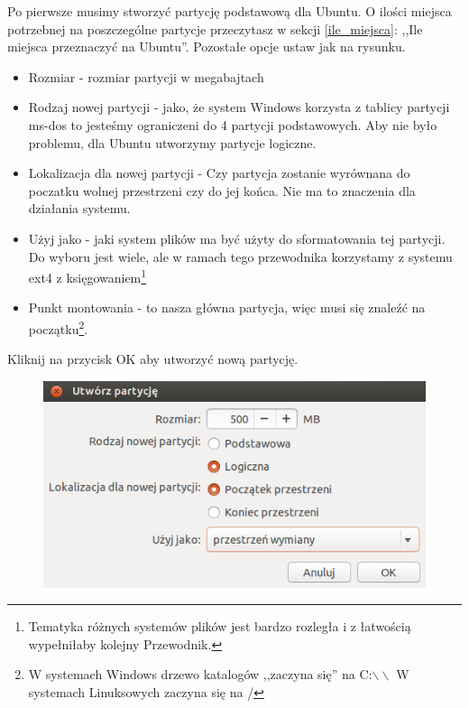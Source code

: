 Po pierwsze musimy stworzyć partycję podstawową dla Ubuntu. O ilości miejsca potrzebnej na poszczególne partycje przeczytasz w sekcji \ref{ile_miejsca}: ,,Ile miejsca przeznaczyć na Ubuntu''. Pozostałe opcje ustaw jak na rysunku.
\begin{itemize}
\item \textcolor{ubuntu_orange}{Rozmiar} - rozmiar partycji w megabajtach
\item \textcolor{ubuntu_orange}{Rodzaj nowej partycji} - jako, że system Windows korzysta z tablicy partycji ms-dos to jesteśmy ograniczeni do 4 partycji podstawowych. Aby nie było problemu, dla Ubuntu utworzymy partycje logiczne.
\item \textcolor{ubuntu_orange}{Lokalizacja dla nowej partycji} - Czy partycja zostanie wyrównana do poczatku wolnej przestrzeni czy do jej końca. Nie ma to znaczenia dla działania systemu.
\item \textcolor{ubuntu_orange}{Użyj jako} - jaki system plików ma być użyty do sformatowania tej partycji. Do wyboru jest wiele, ale w ramach tego przewodnika korzystamy z systemu ext4 z księgowaniem\footnote{Tematyka różnych systemów plików jest bardzo rozległa i z łatwością wypełniłaby kolejny Przewodnik.}
\item \textcolor{ubuntu_orange}{Punkt montowania} - to nasza główna partycja, więc musi się znaleźć na początku\footnote{W systemach Windows drzewo katalogów ,,zaczyna się'' na C:$\backslash\backslash$ W systemach Linuksowych zaczyna się na /}.
\end{itemize}
Kliknij na przycisk \textcolor{ubuntu_orange}{OK} aby utworzyć nową partycję.
\clearpage
\begin{figure}
                \includegraphics[width=\linewidth]{images/instalator_partycjonowanie_gparted_dodaj_swap.png}
\end{figure}

